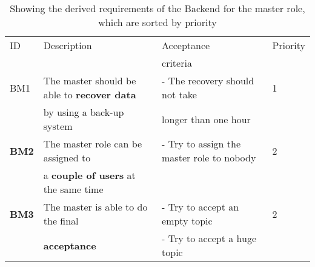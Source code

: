 \documentclass[twoside,openright,fleqn,pointlessnumbers,headinclude,,11pt,a4paper,BCOR5mm,footinclude,cleardoubleempty,abstracton %
                ]{scrreprt}
\begin{document}
	\begin{table}[h]
			\caption{Showing the derived requirements of the Backend for the master role, which are sorted by priority}
	\centering%
	\begin{tabular}{llll}
			\hline
	ID 	& Description 	& Acceptance 	& Priority \\
	 	& 			 & criteria 	&  \\
		\hline
	BM1 & The master should be able to \textbf{recover data} 	& - The recovery should not take & 1	\\
	 	& by using a back-up system					& longer than one hour & 		\\
	\hline
	\textbf{BM2} & The master role can be assigned to 				& - Try to assign the master role to nobody & 2	\\
	 	& a \textbf{couple of users} at the same time 			&  & 	\\
	\hline
	\textbf{BM3} & The master is able to do the final  				& - Try to accept an empty topic & 2\\
	 	& \textbf{acceptance} 							& - Try to accept a huge topic & \\
			\hline
	\end{tabular}
	\label{RequirementsBackendMaster}
	\end{table}
\end{document}

